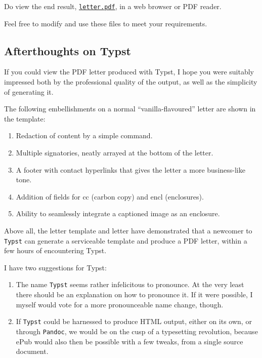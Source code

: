 \documentclass[
  a4paper,
]{article}
\begin{document}
Do view the end result,
\href{auxiliary/letter.pdf}{\texttt{letter.pdf}}, in a web browser or
PDF reader.

Feel free to modify and use these files to meet your requirements.

\hypertarget{afterthoughts-on-typst}{%
\subsection{Afterthoughts on Typst}\label{afterthoughts-on-typst}}

If you could view the PDF letter produced with Typst, I hope you were
suitably impressed both by the professional quality of the output, as
well as the simplicity of generating it.

The following embellishments on a normal ``vanilla-flavoured'' letter
are shown in the template:

\begin{enumerate}
\def\labelenumi{\alph{enumi}.}
\item
  Redaction of content by a simple command.
\item
  Multiple signatories, neatly arrayed at the bottom of the letter.
\item
  A footer with contact hyperlinks that gives the letter a more
  business-like tone.
\item
  Addition of fields for cc (carbon copy) and encl (enclosures).
\item
  Ability to seamlessly integrate a captioned image as an enclosure.
\end{enumerate}

Above all, the letter template and letter have demonstrated that a
newcomer to \texttt{Typst} can generate a serviceable template and
produce a PDF letter, within a few hours of encountering Typst.

I have two suggestions for Typst:

\begin{enumerate}
\def\labelenumi{\roman{enumi}.}
\item
  The name \texttt{Typst} seems rather infelicitous to pronounce. At the
  very least there should be an explanation on how to pronounce it. If
  it were possible, I myself would vote for a more pronounceable name
  change, though.  \normalfont
\item
  If \texttt{Typst} could be harnessed to produce HTML output, either on
  its own, or through \texttt{Pandoc}, we would be on the cusp of a
  typesetting revolution, because ePub would also then be possible with
  a few tweaks, from a single source document.
\end{enumerate}
\end{document}
